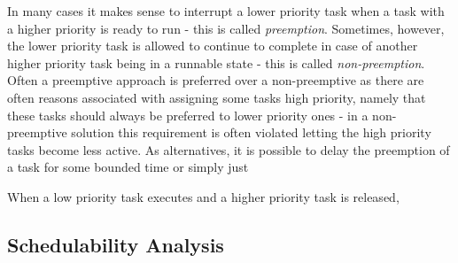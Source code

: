 In many cases it makes sense to interrupt a lower priority task when a task with a higher priority is ready to run - this is called \textit{preemption}. Sometimes, however, the lower priority task is allowed to continue to complete in case of another higher priority task being in a runnable state - this is called \textit{non-preemption}. Often a preemptive approach is preferred over a non-preemptive as there are often reasons associated with assigning some tasks high priority, namely that these tasks should always be preferred to lower priority ones - in a non-preemptive solution this requirement is often violated letting the high priority tasks become less active. As alternatives, it is possible to delay the preemption of a task for some bounded time or simply just  


 When a low priority task executes and a higher priority task is released,  


\subsection{Schedulability Analysis} %


\label{sec:schedulability_analysis}


